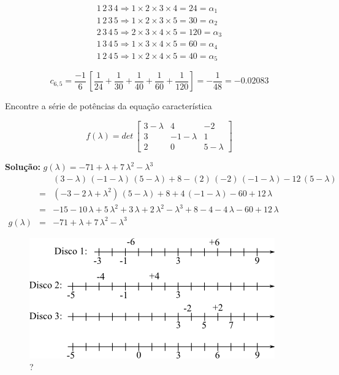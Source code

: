 \begin{itemize}
\begin{itemize}
\[
 \begin{array}{l}
  1 \, 2 \, 3 \, 4 \Rightarrow 1 \times 2 \times 3 \times 4 = 24 = \alpha_1\\
  1 \, 2 \, 3 \, 5 \Rightarrow 1 \times 2 \times 3 \times 5 = 30 = \alpha_2\\
  2 \, 3 \, 4 \, 5 \Rightarrow 2 \times 3 \times 4 \times 5 = 120 = \alpha_3\\
  1 \, 3 \, 4 \, 5 \Rightarrow 1 \times 3 \times 4 \times 5 = 60 = \alpha_4\\
  1 \, 2 \, 4 \, 5 \Rightarrow 1 \times 2 \times 4 \times 5 = 40 = \alpha_5
 \end{array}
\]

\[
 c_{6,5}
 = \frac{-1}{6} \, \left[ \frac{1}{24} + \frac{1}{30} + \frac{1}{40} + \frac{1}{60} + \frac{1}{120} \right]
 = - \frac{1}{48}
 = -0.02083
\]

\begin{example}

Encontre a série de potências da equação característica

\[
 f(\lambda)
 = det \,
 \left[
 \begin{array}{rrr}
  3-\lambda & 4          & -2\\
  3         & -1-\lambda & 1\\
  2         & 0          & 5-\lambda
 \end{array}
 \right]
\]

\textbf{Solução:} $ g(\lambda) = -71 + \lambda + 7 \, \lambda^2 - \lambda^3 $\\

\[
 \begin{array}{lll}
  & & (3-\lambda) \, (-1-\lambda) \, (5-\lambda) + 8 - (2) \, (-2) \, (-1-\lambda) - 12 \, (5-\lambda)\\
  & = & (-3 -2 \, \lambda + \lambda^2) \, (5 - \lambda) + 8 + 4 \, (-1 -\lambda) - 60 + 12 \, \lambda\\
  & = & -15 -10 \, \lambda + 5 \, \lambda^2 + 3 \, \lambda + 2 \, \lambda^2 - \lambda^3 + 8 - 4 -4 \, \lambda - 60 + 12 \, \lambda\\
  g(\lambda) & = & -71 + \lambda + 7 \, \lambda^2 - \lambda^3
 \end{array}
\]

\end{example}

\begin{figure}[htb]
 \centering
 \includegraphics[scale=0.8]{capitulos/capitulo5/figuras/met_inter3.png}
 \caption{?}
 \label{fig:met_inter3}
\end{figure}


\end{itemize}
\end{itemize}
